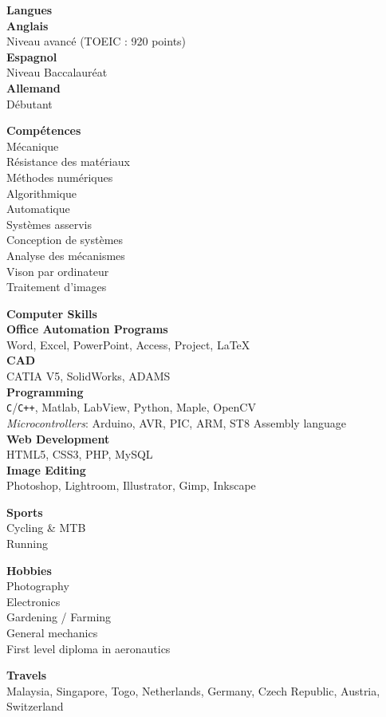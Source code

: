 \documentclass[a4paper,11pt,final]{memoir}
\newcommand{\Sep}{\vspace{1.5em}}
\newcommand{\SmallSep}{\vspace{0.5em}}
\newcommand{\SkillSection}[1]
	{\small{\textbf{#1\\}}\normalfont\footnotesize}
\newcommand{\SkillItem}[1]
	{\textbf{\color{RoyalBlue} #1}\normalfont\\}
\begin{document}
\begin{flushleft}
\SkillSection{Langues}
\SkillItem{Anglais}
Niveau avancé (TOEIC : 920 points)\\
\SkillItem{Espagnol}
Niveau Baccalauréat\\
\SkillItem{Allemand}
Débutant
\Sep

\SkillSection{Compétences}
Mécanique\\
Résistance des matériaux\\
Méthodes numériques\\
Algorithmique\\
Automatique\\
Systèmes asservis\\
Conception de systèmes\\
Analyse des mécanismes\\
Vison par ordinateur\\
Traitement d'images
\Sep

\SkillSection{Computer Skills}
\SkillItem{Office Automation Programs}
Word, Excel, PowerPoint, Access, Project, \LaTeX\\
\SkillItem{CAD}
CATIA V5, SolidWorks, ADAMS\\
\SkillItem{Programming}
\verb!C!/\verb!C++!, Matlab, LabView, Python, Maple, OpenCV\\
\emph{Microcontrollers}: Arduino, AVR, PIC, ARM, ST8 Assembly language\\
\SkillItem{Web Development}
HTML5, CSS3, PHP, MySQL\\
\SkillItem{Image Editing}
Photoshop, Lightroom, Illustrator, Gimp, Inkscape\\
\Sep

\SkillSection{Sports}
Cycling \& MTB\\
Running\\
\SmallSep

\SkillSection{Hobbies}
Photography\\
Electronics\\
Gardening / Farming\\
General mechanics\\
First level diploma in aeronautics
\SmallSep

\SkillSection{Travels}
Malaysia, Singapore, Togo, Netherlands, Germany, Czech Republic, Austria, Switzerland
\end{flushleft}
\framebreak
\end{document}
